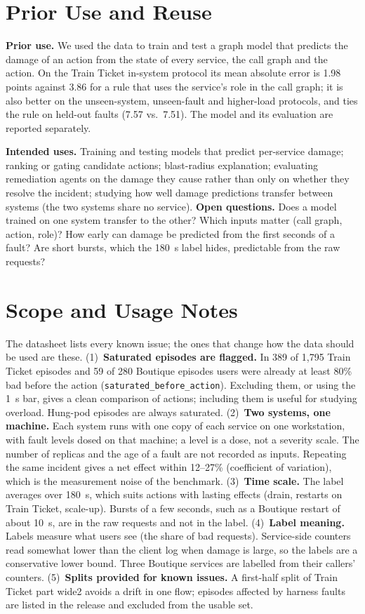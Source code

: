 \documentclass[10pt,conference]{IEEEtran}
\begin{document}
\section{Prior Use and Reuse}\label{sec:uses}
\textbf{Prior use.} We used the data to train and test a graph model that predicts the damage of an action from the state of every service, the call graph and the action. On the Train Ticket in-system protocol its mean absolute error is 1.98 points against 3.86 for a rule that uses the service's role in the call graph; it is also better on the unseen-system, unseen-fault and higher-load protocols, and ties the rule on held-out faults (7.57 vs.\ 7.51). The model and its evaluation are reported separately.

\textbf{Intended uses.} Training and testing models that predict per-service damage; ranking or gating candidate actions; blast-radius explanation; evaluating remediation agents on the damage they cause rather than only on whether they resolve the incident; studying how well damage predictions transfer between systems (the two systems share no service).
\textbf{Open questions.} Does a model trained on one system transfer to the other? Which inputs matter (call graph, action, role)? How early can damage be predicted from the first seconds of a fault? Are short bursts, which the 180~s label hides, predictable from the raw requests?

\section{Scope and Usage Notes}
The datasheet lists every known issue; the ones that change how the data should be used are these.
(1)~\textbf{Saturated episodes are flagged.} In 389 of 1{,}795 Train Ticket episodes and 59 of 280 Boutique episodes users were already at least 80\% bad before the action (\texttt{saturated\_before\_action}). Excluding them, or using the 1~s bar, gives a clean comparison of actions; including them is useful for studying overload. Hung-pod episodes are always saturated.
(2)~\textbf{Two systems, one machine.} Each system runs with one copy of each service on one workstation, with fault levels dosed on that machine; a level is a dose, not a severity scale. The number of replicas and the age of a fault are not recorded as inputs. Repeating the same incident gives a net effect within 12--27\% (coefficient of variation), which is the measurement noise of the benchmark.
(3)~\textbf{Time scale.} The label averages over 180~s, which suits actions with lasting effects (drain, restarts on Train Ticket, scale-up). Bursts of a few seconds, such as a Boutique restart of about 10~s, are in the raw requests and not in the label.
(4)~\textbf{Label meaning.} Labels measure what users see (the share of bad requests). Service-side counters read somewhat lower than the client log when damage is large, so the labels are a conservative lower bound. Three Boutique services are labelled from their callers' counters.
(5)~\textbf{Splits provided for known issues.} A first-half split of Train Ticket part wide2 avoids a drift in one flow; episodes affected by harness faults are listed in the release and excluded from the usable set.
\end{document}
